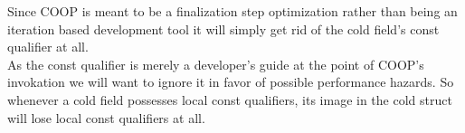 Since COOP is meant to be a finalization step  optimization rather than being an iteration based development tool it will simply get rid of the cold field's const qualifier at all.\\
As the const qualifier is merely a developer's guide at the point of COOP's invokation we will want to ignore it in favor of possible performance hazards. So whenever a cold field possesses local const qualifiers, its image in the cold struct will lose local const qualifiers at all.
